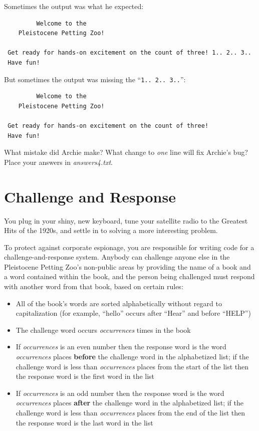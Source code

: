 Sometimes the output was what he expected:
\begin{verbatim}
         Welcome to the
    Pleistocene Petting Zoo!

 Get ready for hands-on excitement on the count of three! 1.. 2.. 3..
 Have fun!
\end{verbatim}

But sometimes the output was missing the
``\texttt{1.. 2.. 3..}'':
\begin{verbatim}
         Welcome to the
    Pleistocene Petting Zoo!

 Get ready for hands-on excitement on the count of three!
 Have fun!
\end{verbatim}

What mistake did Archie make? What change to \textit{one} line will fix
Archie's bug? Place your answers in \textit{answers4.txt}.


\section{Challenge and Response}

You plug in your shiny, new keyboard, tune your satellite radio to the
Greatest Hits of the 1920s, and settle in to solving a more interesting problem.

To protect against corporate espionage, you are responsible for writing code
for a challenge-and-response system. Anybody can challenge anyone else in the
Pleistocene Petting Zoo's non-public areas by providing the name of a book and
a word contained within the book, and the person being challenged must respond
with another word from that book, based on certain rules:
\begin{itemize}
\item All of the book's words are sorted alphabetically without regard to
    capitalization (for example, ``hello'' occurs after ``Hear'' and before
    ``HELP'')
\item The challenge word occurs \textit{occurrences} times in the book
\item If \textit{occurrences} is an even number then the response word is the
    word \textit{occurrences} places \textbf{before} the challenge word in the
    alphabetized list; if the challenge word is less than \textit{occurrences}
    places from the start of the list then the response word is the first word
    in the list
\item If \textit{occurrences} is an odd number then the response word is the
    word \textit{occurrences} places \textbf{after} the challenge word in the
    alphabetized list; if the challenge word is less than \textit{occurrences}
    places from the end of the list then the response word is the last word
    in the list
\end{itemize}


